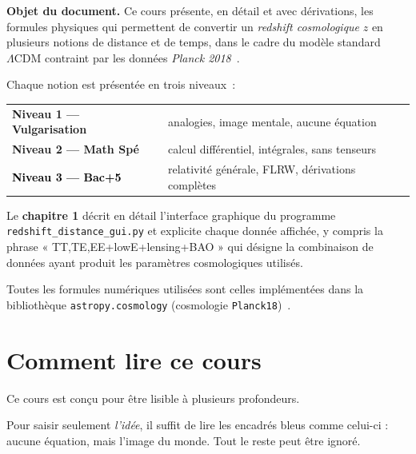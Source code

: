\documentclass[11pt,a4paper,openany]{report}
\begin{document}
\begin{tcolorbox}[colback=boxbgblue,colframe=accentcyan,arc=2mm]
\textbf{Objet du document.} Ce cours présente, en détail et avec dérivations,
les formules physiques qui permettent de convertir un \emph{redshift
cosmologique} $z$ en plusieurs notions de distance et de temps, dans le cadre
du modèle standard $\Lambda\text{CDM}$ contraint par les données
\emph{Planck 2018}~\cite{Planck2018}.

\medskip
Chaque notion est présentée en trois niveaux~:

\medskip
\begin{tabular}{ll}
\textcolor{accentcyan}{\textbf{Niveau 1 --- Vulgarisation}} &
analogies, image mentale, aucune équation \\
\textcolor{accentsage}{\textbf{Niveau 2 --- Math Spé}} &
calcul différentiel, intégrales, sans tenseurs \\
\textcolor{black}{\textbf{Niveau 3 --- Bac+5}} &
relativité générale, FLRW, dérivations complètes \\
\end{tabular}

\medskip
Le \textbf{chapitre 1} décrit en détail l'interface graphique du programme
\texttt{redshift\_distance\_gui.py} et explicite chaque donnée affichée,
y compris la phrase « TT,TE,EE+lowE+lensing+BAO » qui désigne la combinaison
de données ayant produit les paramètres cosmologiques utilisés.

\medskip
Toutes les formules numériques utilisées sont celles implémentées dans la
bibliothèque \texttt{astropy.cosmology} (cosmologie
\texttt{Planck18})~\cite{astropy}.
\end{tcolorbox}

\tableofcontents
\clearpage

\chapter*{Comment lire ce cours}

Ce cours est conçu pour être lisible à plusieurs profondeurs.

\begin{tcolorbox}[vulgarisation]
Pour saisir seulement \emph{l'idée}, il suffit de lire les encadrés bleus
comme celui-ci : aucune équation, mais l'image du monde. Tout le reste peut
être ignoré.
\end{tcolorbox}
\end{document}
